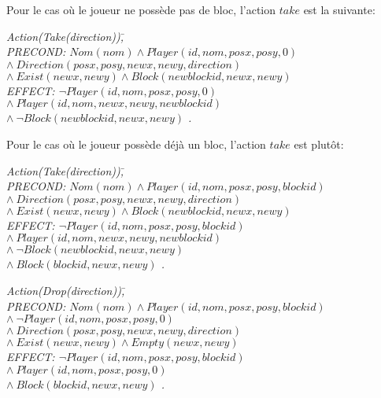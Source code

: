 \documentclass[12pt,english,frenchb,letterpaper]{article}
\begin{document}
Pour le cas où le joueur ne possède pas de bloc, l'action $take$ est la suivante:

\begin{tabbing}
\it{Action}\=\it{(Take(direction))}\=,\\
\> PRECOND: \> $Nom(nom) \wedge Player(id,nom,posx,posy,0)$ \\ 
\> \> $  \wedge \ Direction(posx,posy,newx,newy,direction) $ \\
\> \> $   \wedge \ Exist(newx,newy) \wedge Block(newblockid,newx,newy) $ \\               
\> EFFECT: \>$ \lnot Player(id,nom,posx,posy,0) $ \\
\>  \> $\wedge\ Player(id,nom,newx,newy,newblockid)$ \\
\> \> $\wedge\ \lnot Block(newblockid,newx,newy) $ .\\
\end{tabbing}

Pour le cas où le joueur possède déjà un bloc, l'action $take$ est plutôt:
\begin{tabbing}
\it{Action}\=\it{(Take(direction))}\=,\\
\> PRECOND: \> $Nom(nom) \wedge Player(id,nom,posx,posy,blockid)$ \\ 
\> \> $  \wedge \ Direction(posx,posy,newx,newy,direction) $ \\
\> \> $   \wedge \ Exist(newx,newy) \wedge Block(newblockid,newx,newy) $ \\               
\> EFFECT: \>$ \lnot Player(id,nom,posx,posy,blockid) $ \\
\>  \> $\wedge\ Player(id,nom,newx,newy,newblockid)$ \\
\> \> $\wedge\ \lnot Block(newblockid,newx,newy) $ \\
\> \> $\wedge\ Block(blockid,newx,newy) $ .\\
\end{tabbing}

\begin{tabbing}
\it{Action}\=\it{(Drop(direction))}\=,\\
\> PRECOND: \> $Nom(nom) \wedge Player(id,nom,posx,posy,blockid)$ \\ 
\> \> $  \wedge \  \lnot Player(id,nom,posx,posy,0) $ \\
\> \> $  \wedge \ Direction(posx,posy,newx,newy,direction) $ \\
\> \> $   \wedge \ Exist(newx,newy) \wedge Empty(newx,newy) $ \\               
\> EFFECT: \>$ \lnot Player(id,nom,posx,posy,blockid) $ \\
\>  \> $\wedge\ Player(id,nom,posx,posy,0)$ \\
\> \> $\wedge\ Block(blockid,newx,newy) $ .\\
\end{tabbing}
\end{document}
